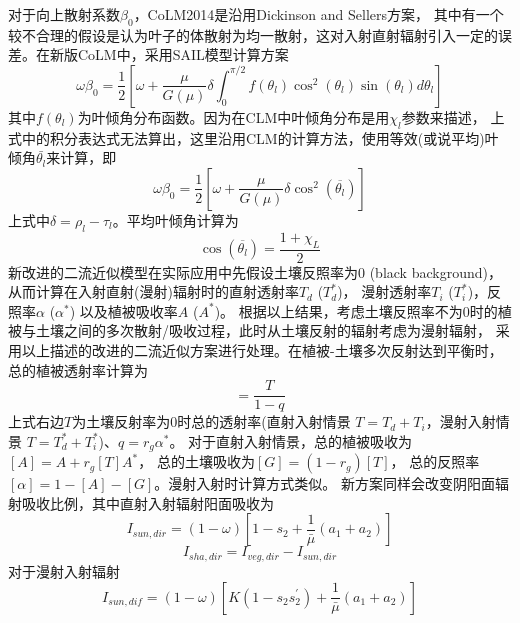 对于向上散射系数$\beta_0$，CoLM2014是沿用Dickinson and Sellers方案\citep{dickinson1983land,sellers1985canopy}，
其中有一个较不合理的假设是认为叶子的体散射为均一散射，这对入射直射辐射引入一定的误差。在新版CoLM中，采用SAIL模型计算方案
\begin{equation}
\omega \beta_{0}=\frac{1}{2}\left[\omega+\frac{\mu}{G(\mu)} \delta \int_{0}^{\pi / 2} 
f\left(\theta_{l}\right) \cos ^{2}\left(\theta_{l}\right) \sin \left(\theta_{l}\right) d \theta_{l}\right]
\end{equation}
其中$f\left(\theta_l\right)$为叶倾角分布函数。因为在CLM中叶倾角分布是用$\chi_l$参数来描述，
上式中的积分表达式无法算出，这里沿用CLM的计算方法，使用等效(或说平均)叶倾角$\bar{\theta_l}$来计算，即
\begin{equation}
\omega \beta_{0}=\frac{1}{2}\left[\omega+\frac{\mu}{G(\mu)} \delta \cos ^{2}\left(\overline{\theta_{l}}\right)\right]
\end{equation}
上式中$\delta=\rho_l-\tau_l$。平均叶倾角计算为
\begin{equation}
\cos \left(\overline{\theta_{l}}\right)=\frac{1+\chi_{L}}{2}
\end{equation}
新改进的二流近似模型在实际应用中先假设土壤反照率为0 (black background)，从而计算在入射直射(漫射)辐射时的直射透射率$T_d$ ($T_d^\ast$)，
漫射透射率$T_i$ ($T_i^\ast$)，反照率$\alpha$ ($\alpha^\ast$) 以及植被吸收率$A$ ($A^\ast$)。
根据以上结果，考虑土壤反照率不为0时的植被与土壤之间的多次散射/吸收过程，此时从土壤反射的辐射考虑为漫射辐射，
采用以上描述的改进的二流近似方案进行处理。在植被-土壤多次反射达到平衡时，总的植被透射率计算为
\begin{equation}
[T]=\frac{T}{1-q}
\end{equation}
上式右边$T$为土壤反射率为0时总的透射率(直射入射情景 $T=T_d+T_i$，漫射入射情景 $T=T_d^\ast+T_i^\ast$)、$q=r_g\alpha^\ast$。
对于直射入射情景，总的植被吸收为$\left[A\right]=A+r_g\left[T\right]A^\ast$，
总的土壤吸收为$\left[G\right]=\left(1-r_g\right)\left[T\right]$，
总的反照率$\left[\alpha\right]=1-\left[A\right]-\left[G\right]$。漫射入射时计算方式类似。
新方案同样会改变阴阳面辐射吸收比例，其中直射入射辐射阳面吸收为
\begin{equation}
I_{sun,dir}=(1-\omega)\left[1-s_{2}+\frac{1}{\bar{\mu}}\left(a_{1}+a_{2}\right)\right]
\end{equation}
\begin{equation}
I_{sha,dir}=I_{veg,dir}-I_{sun,dir}
\end{equation}
对于漫射入射辐射
\begin{equation}
I_{sun,dif}=(1-\omega)\left[K\left(1-s_{2} s_{2}^{\prime}\right)+\frac{1}{\bar{\mu}}\left(a_{1}+a_{2}\right)\right]
\end{equation}
